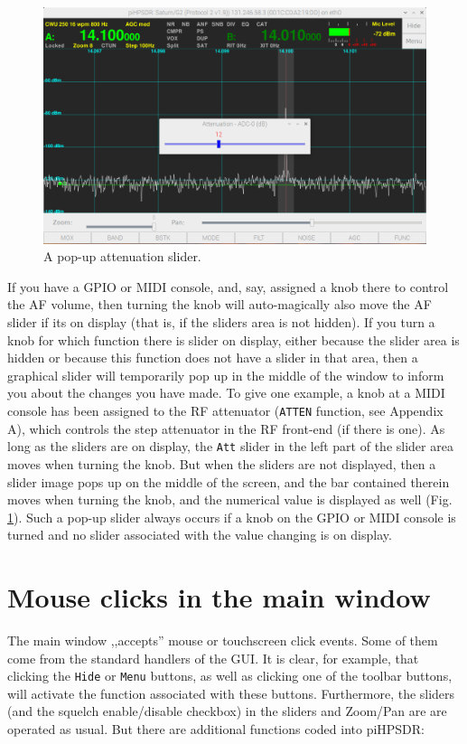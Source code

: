 \documentclass[12pt]{book}
\def\rett#1{\texttt{\color{red}#1}}
\begin{document}
\begin{figure}
\center
\includegraphics[width=12cm]{SliderOnScreen.png}
\caption{A pop-up attenuation slider.}
\label{fig:SliderOnScreen}
\end{figure}

If you have a GPIO or  MIDI  console, and, say, assigned
a knob there to control the AF volume, then turning the
knob will auto-magically also move the AF slider if its
on display (that is, if the sliders area is not hidden).
If you turn a knob for which function there is slider
on display, either because the slider area is hidden or
because this function does not have a slider in that area,
then a graphical slider will temporarily pop up in the
middle of the window to inform you about the changes 
you have  made. To give one example, a knob at a
MIDI console has been assigned to the RF attenuator (\texttt{ATTEN}
function, see Appendix A), which controls the step 
attenuator in the RF front-end (if there is one). As long
as the  sliders  are  on display, the \texttt{Att} slider
in the left part of the slider area moves when turning
the knob. But when the sliders are not displayed, then a slider image
pops up  on the middle of the screen, and the
bar contained therein moves when turning the knob,
and the numerical value is displayed as well (Fig. \ref{fig:SliderOnScreen}).
Such a pop-up slider always occurs if a knob on the GPIO or MIDI
console is turned and no slider associated with the value changing is
on display.


\section{Mouse clicks in the main window}
The main window ,,accepts'' mouse or touchscreen click events.
Some of them come from the standard handlers of the GUI. It is
clear, for example, that clicking the \rett{Hide} or
\rett{Menu} buttons, as well as clicking one of the
toolbar buttons, will activate the function associated with
these buttons. Furthermore, the sliders (and the squelch enable/disable
checkbox) in the sliders and Zoom/Pan are are operated as usual.
But there are additional functions coded into piHPSDR:
\end{document}
